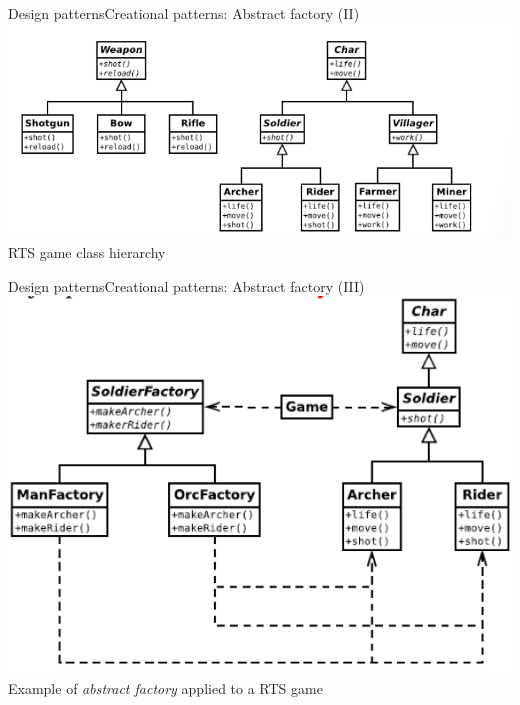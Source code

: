\documentclass[10pt,compress]{beamer} %
\begin{document}
\begin{frame}{Design patterns}{Creational patterns: Abstract factory (II)}
	\centering\includegraphics[width=0.8\linewidth]{figs/jerarquiajuego}\\
	\centering RTS game class hierarchy
\end{frame}

\begin{frame}{Design patterns}{Creational patterns: Abstract factory (III)}
	\centering\includegraphics[width=0.7\linewidth]{figs/abstractfactorygame}\\
	\centering Example of \textit{abstract factory} applied to a RTS game
\end{frame}
\end{document}
